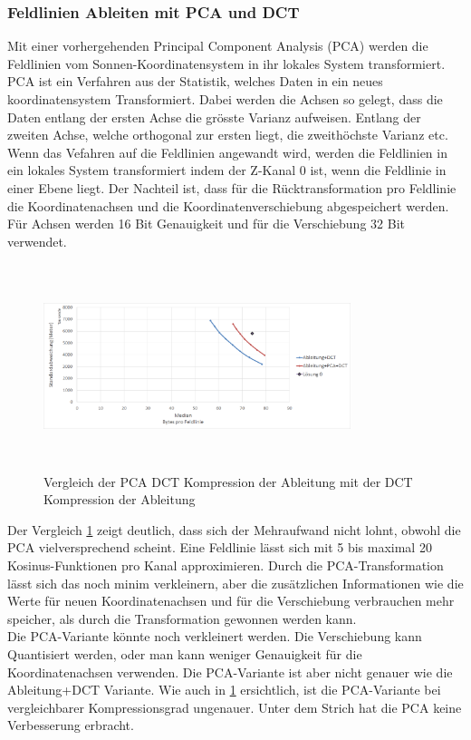 \subsubsection{Feldlinien Ableiten mit PCA und DCT}
Mit einer vorhergehenden Principal Component Analysis (PCA) \cite{abdi2010principal} werden die Feldlinien vom Sonnen-Koordinatensystem in ihr lokales System transformiert. 
PCA ist ein Verfahren aus der Statistik, welches Daten in ein neues koordinatensystem Transformiert. Dabei werden die Achsen so gelegt, dass die Daten entlang der ersten Achse die grösste Varianz aufweisen. Entlang der zweiten Achse, welche orthogonal zur ersten liegt, die zweithöchste Varianz etc. Wenn das Vefahren auf die Feldlinien angewandt wird, werden die Feldlinien in ein lokales System transformiert indem der Z-Kanal 0 ist, wenn die Feldlinie in einer Ebene liegt. Der Nachteil ist, dass für die Rücktransformation pro Feldlinie die Koordinatenachsen und die Koordinatenverschiebung abgespeichert werden. Für Achsen werden 16 Bit Genauigkeit und für die Verschiebung 32 Bit verwendet.
\begin{figure}[!htbp]
	\center
	\includegraphics[width=0.8\textwidth,height=6cm,keepaspectratio]{./pictures/resultate/loesung1/loesung1-4/loesung1_4.png}
	\caption{Vergleich der PCA DCT Kompression der Ableitung mit der DCT Kompression der Ableitung}
	\label{resultate:loesung1:dct:pca}
\end{figure}
Der Vergleich \ref{resultate:loesung1:dct:pca} zeigt deutlich, dass sich der Mehraufwand nicht lohnt, obwohl die PCA vielversprechend scheint. Eine Feldlinie lässt sich mit 5 bis maximal 20 Kosinus-Funktionen pro Kanal approximieren. Durch die PCA-Transformation lässt sich das noch minim verkleinern, aber die zusätzlichen Informationen wie die Werte für neuen Koordinatenachsen und für die Verschiebung verbrauchen mehr speicher, als durch die Transformation gewonnen werden kann.\\
Die PCA-Variante könnte noch verkleinert werden. Die Verschiebung kann Quantisiert werden, oder man kann weniger Genauigkeit für die Koordinatenachsen verwenden. Die PCA-Variante ist aber nicht genauer wie die Ableitung+DCT Variante. Wie auch in \ref{resultate:loesung1:dct:pca} ersichtlich, ist die PCA-Variante bei vergleichbarer Kompressionsgrad ungenauer. Unter dem Strich hat die PCA keine Verbesserung erbracht.\\
